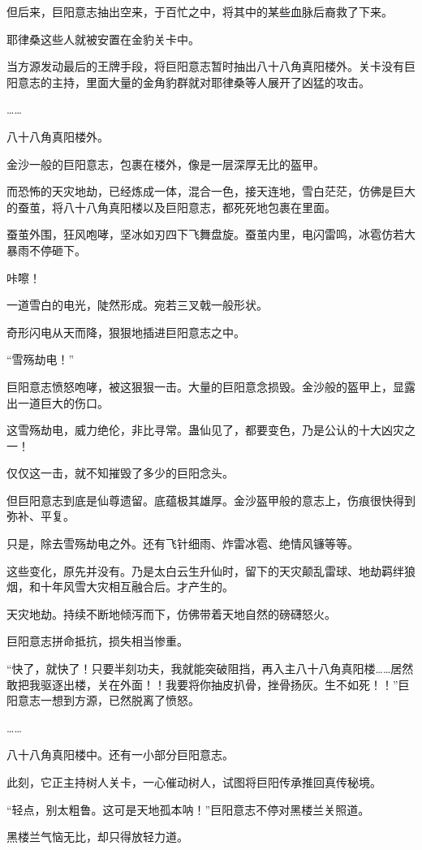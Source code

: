 \begin{this_body}
但后来，巨阳意志抽出空来，于百忙之中，将其中的某些血脉后裔救了下来。

耶律桑这些人就被安置在金豹关卡中。

当方源发动最后的王牌手段，将巨阳意志暂时抽出八十八角真阳楼外。关卡没有巨阳意志的主持，里面大量的金角豹群就对耶律桑等人展开了凶猛的攻击。

……

八十八角真阳楼外。

金沙一般的巨阳意志，包裹在楼外，像是一层深厚无比的盔甲。

而恐怖的天灾地劫，已经炼成一体，混合一色，接天连地，雪白茫茫，仿佛是巨大的蚕茧，将八十八角真阳楼以及巨阳意志，都死死地包裹在里面。

蚕茧外围，狂风咆哮，坚冰如刃四下飞舞盘旋。蚕茧内里，电闪雷鸣，冰雹仿若大暴雨不停砸下。

咔嚓！

一道雪白的电光，陡然形成。宛若三叉戟一般形状。

奇形闪电从天而降，狠狠地插进巨阳意志之中。

“雪殇劫电！”

巨阳意志愤怒咆哮，被这狠狠一击。大量的巨阳意念损毁。金沙般的盔甲上，显露出一道巨大的伤口。

这雪殇劫电，威力绝伦，非比寻常。蛊仙见了，都要变色，乃是公认的十大凶灾之一！

仅仅这一击，就不知摧毁了多少的巨阳念头。

但巨阳意志到底是仙尊遗留。底蕴极其雄厚。金沙盔甲般的意志上，伤痕很快得到弥补、平复。

只是，除去雪殇劫电之外。还有飞针细雨、炸雷冰雹、绝情风镰等等。

这些变化，原先并没有。乃是太白云生升仙时，留下的天灾颠乱雷球、地劫羁绊狼烟，和十年风雪大灾相互融合后。才产生的。

天灾地劫。持续不断地倾泻而下，仿佛带着天地自然的磅礴怒火。

巨阳意志拼命抵抗，损失相当惨重。

“快了，就快了！只要半刻功夫，我就能突破阻挡，再入主八十八角真阳楼……居然敢把我驱逐出楼，关在外面！！我要将你抽皮扒骨，挫骨扬灰。生不如死！！”巨阳意志一想到方源，已然脱离了愤怒。

……

八十八角真阳楼中。还有一小部分巨阳意志。

此刻，它正主持树人关卡，一心催动树人，试图将巨阳传承推回真传秘境。

“轻点，别太粗鲁。这可是天地孤本呐！”巨阳意志不停对黑楼兰关照道。

黑楼兰气恼无比，却只得放轻力道。


\end{this_body}
